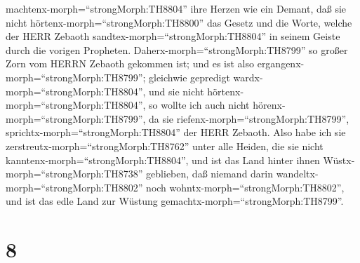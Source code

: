 machtenx-morph=``strongMorph:TH8804'' ihre Herzen wie ein Demant, daß
sie nicht hörtenx-morph=``strongMorph:TH8800'' das Gesetz und die Worte,
welche der HERR Zebaoth sandtex-morph=``strongMorph:TH8804'' in seinem
Geiste durch die vorigen Propheten. Daherx-morph=``strongMorph:TH8799''
so großer Zorn vom HERRN Zebaoth gekommen ist;  und es ist
also ergangenx-morph=``strongMorph:TH8799''; gleichwie gepredigt
wardx-morph=``strongMorph:TH8804'', und sie nicht
hörtenx-morph=``strongMorph:TH8804'', so wollte ich auch nicht
hörenx-morph=``strongMorph:TH8799'', da sie
riefenx-morph=``strongMorph:TH8799'',
sprichtx-morph=``strongMorph:TH8804'' der HERR Zebaoth. 
Also habe ich sie zerstreutx-morph=``strongMorph:TH8762'' unter alle
Heiden, die sie nicht kanntenx-morph=``strongMorph:TH8804'', und ist das
Land hinter ihnen Wüstx-morph=``strongMorph:TH8738'' geblieben, daß
niemand darin wandeltx-morph=``strongMorph:TH8802'' noch
wohntx-morph=``strongMorph:TH8802'', und ist das edle Land zur Wüstung
gemachtx-morph=``strongMorph:TH8799''.

\hypertarget{section-7}{%
\section{8}\label{section-7}}

